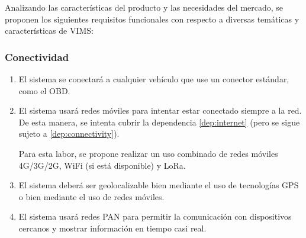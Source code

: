 Analizando las características del producto y las necesidades del mercado, se
proponen los siguientes requisitos funcionales con respecto a diversas temáticas
y características de \ac{VIMS}:

\subsubsection{Conectividad}
\begin{enumerate}[label=\textbf{\texttt{RF-\arabic*}}]
  \item\label{req:connectivity} El sistema se conectará a cualquier vehículo que use
        un conector estándar, como el \ac{OBD}.
  \item\label{req:network} El sistema usará redes móviles para intentar
        estar conectado siempre a la red. De esta manera, se intenta cubrir la dependencia
        \ref{dep:internet} (pero se sigue sujeto a \ref{dep:connectivity}).

        Para esta labor, se propone realizar un uso combinado de redes móviles 4G/3G/2G,
        WiFi (si está disponible) y LoRa.
  \item\label{req:gps} El sistema deberá ser geolocalizable bien mediante el uso
        de tecnologías GPS o bien mediante el uso de redes móviles.
  \item\label{req:bt} El sistema usará redes \ac{PAN} para
        permitir la comunicación con dispositivos cercanos y mostrar información en
        tiempo casi real.
\end{enumerate}

